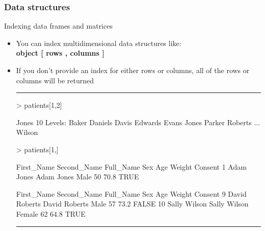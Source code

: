 \documentclass{beamer}
\begin{document}
\begin{frame}[fragile]
	\frametitle{Data structures}
	\centering \LARGE Indexing data frames and matrices
	\begin{itemize}
		\small
		\item You can index multidimensional data structures like:\\ \Large \textbf{object [ rows , columns ]}
		\small
		\item If you don't provide an index for either rows or columns, all of the rows or columns will be returned
\rule{\textwidth}{0.4pt}
\tiny
\setlength{\fancyvrbtopsep}{-1pt}
\setlength{\fancyvrbpartopsep}{-1pt}
\begin{Schunk}
\begin{Sinput}
> patients[1,2]
\end{Sinput}
\begin{Soutput}
[1] Jones
10 Levels: Baker Daniels Davis Edwards Evans Jones Parker Roberts ... Wilson
\end{Soutput}
\end{Schunk}
\vspace{20pt}
\setlength{\fancyvrbtopsep}{-1pt}
\setlength{\fancyvrbpartopsep}{-1pt}
\begin{Schunk}
\begin{Sinput}
> patients[1,]
\end{Sinput}
\begin{Soutput}
  First_Name Second_Name  Full_Name  Sex Age Weight Consent
1       Adam       Jones Adam Jones Male  50   70.8    TRUE
\end{Soutput}
\end{Schunk}
\vspace{20pt}
\begin{Schunk}
\begin{Soutput}
   First_Name Second_Name     Full_Name    Sex Age Weight Consent
9       David     Roberts David Roberts   Male  57   73.2   FALSE
10      Sally      Wilson  Sally Wilson Female  62   64.8    TRUE
\end{Soutput}
\end{Schunk}
\rule{\textwidth}{0.4pt}\\
\small
	\end{itemize}
\end{frame}
\end{document}
